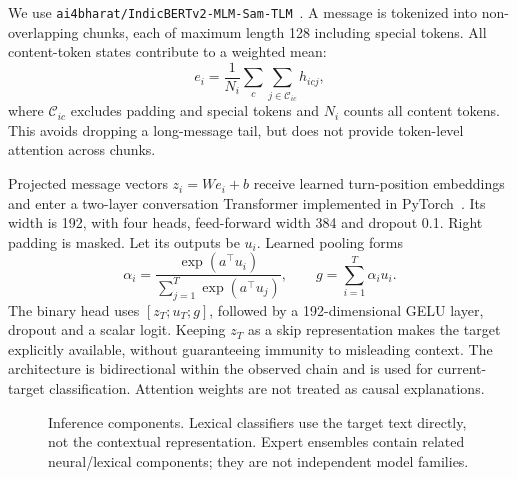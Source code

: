 \documentclass[11pt,a4paper]{article}
\begin{document}
We use \texttt{ai4bharat/IndicBERTv2-MLM-Sam-TLM}~\citep{doddapaneni2023}. A message is tokenized into non-overlapping chunks, each of maximum length 128 including special tokens. All content-token states contribute to a weighted mean:
\begin{equation}
e_i=\frac{1}{N_i}\sum_{c}\sum_{j\in\mathcal C_{ic}} h_{icj},
\end{equation}
where $\mathcal C_{ic}$ excludes padding and special tokens and $N_i$ counts all content tokens. This avoids dropping a long-message tail, but does not provide token-level attention across chunks.

Projected message vectors $z_i=We_i+b$ receive learned turn-position embeddings and enter a two-layer conversation Transformer implemented in PyTorch~\citep{paszke2019}. Its width is 192, with four heads, feed-forward width 384 and dropout 0.1. Right padding is masked. Let its outputs be $u_i$. Learned pooling forms
\begin{equation}
\alpha_i=\frac{\exp(a^\top u_i)}{\sum_{j=1}^{T}\exp(a^\top u_j)},\qquad
g=\sum_{i=1}^{T}\alpha_i u_i.
\end{equation}
The binary head uses $[z_T;u_T;g]$, followed by a 192-dimensional GELU layer, dropout and a scalar logit. Keeping $z_T$ as a skip representation makes the target explicitly available, without guaranteeing immunity to misleading context. The architecture is bidirectional within the observed chain and is used for current-target classification. Attention weights are not treated as causal explanations.

\begin{figure}[htbp]
\centering
{}
\caption{Inference components. Lexical classifiers use the target text directly, not the contextual representation. Expert ensembles contain related neural/lexical components; they are not independent model families.}
\end{figure}
\end{document}

